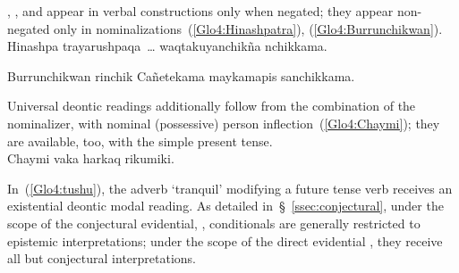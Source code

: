 \noindent
{}, , and  appear in verbal constructions only when negated; they appear non-negated only in nominalizations~(\ref{Glo4:Hinashpatra}), (\ref{Glo4:Burrunchikwan}).\\

%
{Hinashpa trayarushpaqa~\dots{} waqtakuyanchikña nchikkama.}%
{}%
{}{}%

%
{Burrunchikwan rinchik Cañetekama maykamapis sanchikkama.}%
{}%
{}{}%

\noindent
Universal deontic readings additionally follow from the combination of the nominalizer,  with nominal (possessive) person inflection~(\ref{Glo4:Chaymi}); they are available, too, with the simple present tense.\\

%
{Chaymi vaka harkaq rikumiki.}%
{}%
{}{}%

\noindent
In~(\ref{Glo4:tushu}), the adverb  ‘tranquil’ modifying a future tense verb receives an existential deontic modal reading. As detailed in~§~\ref{ssec:conjectural}, under the scope of the conjectural evidential, , conditionals are generally restricted to epistemic interpretations; under the scope of the direct evidential , they receive all but conjectural interpretations.\\

